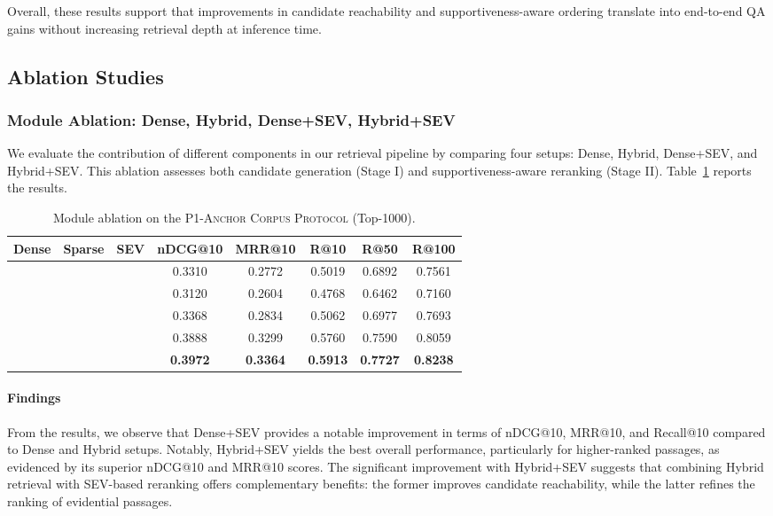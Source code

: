 \documentclass[preprint,12pt,a4paper]{elsarticle}
\newcommand{\cmark}{\ding{51}}
\newcommand{\xmark}{\ding{55}}
\begin{document}
Overall, these results support that improvements in candidate reachability and supportiveness-aware ordering translate into end-to-end QA gains without increasing retrieval depth at inference time.

\FloatBarrier
\subsection{Ablation Studies}
\label{subsec:ablation}

\subsubsection{Module Ablation: Dense, Hybrid, Dense+SEV, Hybrid+SEV}
\label{subsec:module_ablation}
We evaluate the contribution of different components in our retrieval pipeline by comparing four setups: Dense, Hybrid, Dense+SEV, and Hybrid+SEV. This ablation assesses both candidate generation (Stage I) and supportiveness-aware reranking (Stage II). Table~\ref{tab:module_ablation_top1000} reports the results.

\begin{table}[H]
  \centering
  \caption{Module ablation on the \textsc{P1-Anchor Corpus Protocol} (Top-1000).}
  \label{tab:module_ablation_top1000}
  \setlength{\tabcolsep}{4.2pt}
  \small
  \begin{tabular*}{\textwidth}{@{\extracolsep{\fill}}cccccccc@{}}
    \toprule
    \textbf{Dense} & \textbf{Sparse} & \textbf{SEV} &
    \textbf{nDCG@10} & \textbf{MRR@10} & \textbf{R@10} & \textbf{R@50} & \textbf{R@100} \\
    \midrule
    \cmark & \xmark & \xmark & 0.3310 & 0.2772 & 0.5019 & 0.6892 & 0.7561 \\
    \xmark & \cmark & \xmark & 0.3120 & 0.2604 & 0.4768 & 0.6462 & 0.7160 \\
    \cmark & \cmark & \xmark & 0.3368 & 0.2834 & 0.5062 & 0.6977 & 0.7693 \\
    \cmark & \xmark & \cmark & 0.3888 & 0.3299 & 0.5760 & 0.7590 & 0.8059 \\
    \cmark & \cmark & \cmark & \textbf{0.3972} & \textbf{0.3364} & \textbf{0.5913} & \textbf{0.7727} & \textbf{0.8238} \\
    \bottomrule
  \end{tabular*}
\end{table}

\paragraph{Findings}
From the results, we observe that Dense+SEV provides a notable improvement in terms of nDCG@10, MRR@10, and Recall@10 compared to Dense and Hybrid setups. Notably, Hybrid+SEV yields the best overall performance, particularly for higher-ranked passages, as evidenced by its superior nDCG@10 and MRR@10 scores. The significant improvement with Hybrid+SEV suggests that combining Hybrid retrieval with SEV-based reranking offers complementary benefits: the former improves candidate reachability, while the latter refines the ranking of evidential passages.
\end{document}
